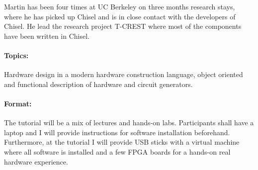 \documentclass{article}
\begin{document}
Martin has been four times at UC Berkeley on three months research stays, where he has picked up Chisel
and is in close contact with the developers of Chisel.
He lead the research project T-CREST where most of the components have been written in Chisel.

\paragraph{Topics:} Hardware design in a modern hardware construction language, object oriented and
functional description of hardware and circuit generators.

\paragraph{Format:}
The tutorial will be a mix of lectures and hands-on labs. Participants shall have a laptop and I will provide
instructions for software installation beforehand. Furthermore, at the tutorial I will provide USB sticks
with a virtual machine where all software is installed and a few FPGA boards for a hands-on real
hardware experience.
\end{document}
